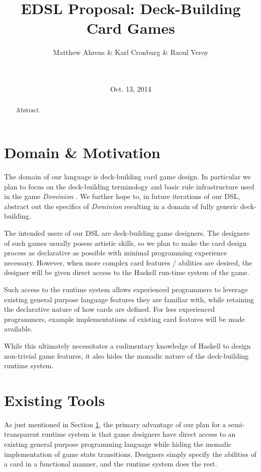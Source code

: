 \documentclass{acm_proc_article-sp}
\begin{document}
\title{EDSL Proposal: Deck-Building Card Games}

\author{
  \alignauthor
  Matthew Ahrens \& Karl Cronburg \& Raoul Veroy \\
   \\
         \\
}
\date{Oct. 13, 2014}

\maketitle

\begin{abstract}
Abstract.
\end{abstract}

\section{Domain \& Motivation}
\label{sec:domain}
The domain of our language is deck-building card game design. In particular we
plan to focus on the deck-building terminology and basic rule infrastructure
used in the game \emph{Dominion} \cite{Vaccarino2008}. We further hope to,
in future iterations of our DSL, abstract out the specifics of \emph{Dominion}
resulting in a domain of fully generic deck-building.

The intended users of our DSL are deck-building game designers. The designers
of such games usually posess artistic skills, so we plan to make the card
design process as declarative as possible with minimal programming experience
necessary. However, when more complex card features / abilities are
desired, the designer will be given direct access to the Haskell run-time
system of the game.

Such access to the runtime system allows experienced
programmers to leverage existing general purpose language features they
are familiar with, while retaining the declarative nature of how cards are
defined. For less experienced programmers, example implementations of
existing card features will be made available.

While this ultimately necessitates a rudimentary knowledge of Haskell
to design non-trivial game features, it also hides the monadic nature of
the deck-building runtime system.

\section{Existing Tools}
\label{sec:existing_tools}
As just mentioned in Section \ref{sec:domain}, the primary advantage of our
plan for a semi-transparent runtime system \footnotemark[1] is that game
designers have direct access to an existing general purpose programming
language while hiding the
monadic implementation of game state transitions. Designers simply specify
the abilities of a card in a functional manner, and the runtime system does
the rest.
\end{document}
